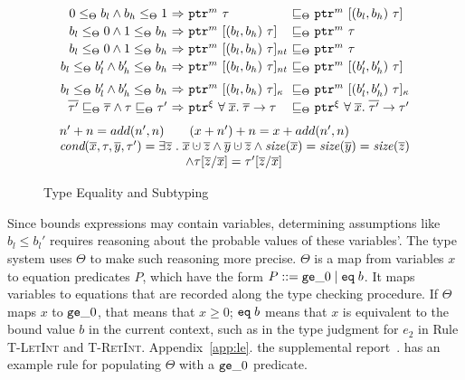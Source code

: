 \begin{DIFnomarkup}
\begin{figure}
{\[\begin{array}{l}
\begin{array}{r@{~}c@{~}l@{~}c@{~}l}
    0\le_{\Theta} b_l \wedge b_h \le_{\Theta} 1 &\Rightarrow& \tptr{\tau}{m}&\sqsubseteq_{\Theta}& \tarrayptr{b_l}{b_h}{\tau}{m}\\[0.2em]
    b_l \le_{\Theta} 0 \wedge 1 \le_{\Theta} b_h &\Rightarrow& \tarrayptr{b_l}{b_h}{\tau}{m} &\sqsubseteq_{\Theta}& \tptr{\tau}{m}\\[0.2em]
    b_l \le_{\Theta} 0 \wedge 1 \le_{\Theta} b_h &\Rightarrow& \tntarrayptr{b_l}{b_h}{\tau}{m} &\sqsubseteq_{\Theta}& \tptr{\tau}{m}\\[0.2em]
    b_l \le_{\Theta} b_l' \wedge b_h' \le_{\Theta} b_h &\Rightarrow& \tntarrayptr{b_l}{b_h}{\tau}{m} &\sqsubseteq_{\Theta}& \tarrayptr{b_l'}{b_h'}{\tau}{m}\\[0.6em]
    b_l \le_{\Theta} b_l' \wedge b_h' \le_{\Theta} b_h &\Rightarrow& \tallarrayptr{b_l}{b_h}{\tau}{m} &\sqsubseteq_{\Theta}& \tallarrayptr{b_l'}{b_h'}{\tau}{m}
\\[0.2em]
\overline{\tau'}\sqsubseteq_{\Theta}\overline{\tau}\wedge \tau\sqsubseteq_{\Theta}\tau' &\Rightarrow& \tptr{\tfun{\overline{x}}{\overline{\tau}}{\tau}}{\xi} &\sqsubseteq_{\Theta}& \tptr{\tfun{\overline{x}}{\overline{\tau'}}{\tau'}}{\xi}

    \end{array}
\end{array}
  \]
}
{\footnotesize
\[
\begin{array}{l}
n'+n = add(n',n)
\qquad
(x+n')+n = x+add(n',n)\\
\textit{cond}(\overline{x},\tau,\overline{y},\tau')
=\exists\overline{z}\;.\;\overline{x}\cupdot\overline{z}
  \wedge \overline{y}\cupdot\overline{z}
  \wedge \size(\overline{x})=\size(\overline{y})=\size(\overline{z})
\\\qquad\qquad\qquad\qquad\qquad
  \wedge \tau[\overline{z}/\overline{x}]= \tau'[\overline{z}/\overline{x}]
\end{array}
\]
}
  \caption{Type Equality and Subtyping}
  \label{fig:checkc-subtype}
\end{figure}
\end{DIFnomarkup}

Since bounds expressions may
contain variables, determining assumptions like $b_l \leq b_l'$
requires reasoning about the probable values of these variables'. The type
system uses $\Theta$ to make such reasoning more precise.
$\Theta$ is a map from variables $x$ to
equation predicates $P$, which have the form $P ::= \texttt{ge}\_0 \;|\; \texttt{eq}\;{b}$.
It maps variables to equations that are recorded along the type checking procedure.
If $\Theta$ maps $x$ to $\texttt{ge}\_0$, that means that $x \ge 0$;
$\texttt{eq}\;{b}$ means that $x$ is equivalent to the bound value $b$ in the current context, 
such as in the type judgment for $e_2$ in Rule \textsc{T-LetInt} and \textsc{T-RetInt}.
\iftr
  Appendix~\ref{app:le}.
\else
  the supplemental report~\cite{checkedc-tech-report}.
\fi has an example rule for populating $\Theta$ with a $\texttt{ge}\_0$ predicate.

